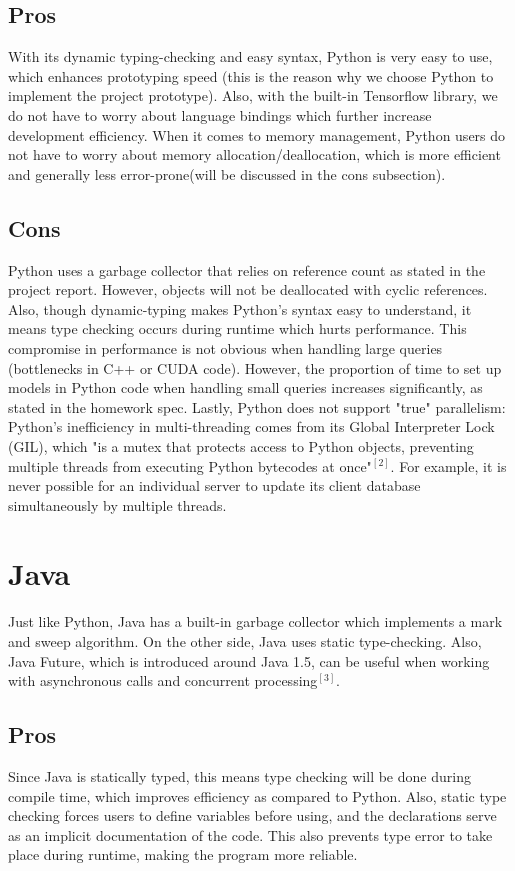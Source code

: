 \documentclass[letterpaper,twocolumn,10pt]{article}
\begin{document}
\subsection{Pros}
With its dynamic typing-checking and easy syntax, Python is very easy to use, which enhances prototyping speed (this is the reason why we choose Python to implement the project prototype). Also, with the built-in Tensorflow library, we do not have to worry about  language bindings which further increase development efficiency. When it comes to memory management, Python users do not have to worry about memory allocation/deallocation, which is more efficient and generally less error-prone(will be discussed in the cons subsection).

\subsection{Cons}
Python uses a garbage collector that relies on reference count as stated in the project report. However, objects will not be deallocated with cyclic references. Also, though dynamic-typing makes Python's syntax easy to understand, it means type checking occurs during runtime which hurts performance. This compromise in performance is not obvious when handling large queries (bottlenecks in C++ or CUDA code). However, the proportion of time to set up models in Python code when handling small queries increases significantly, as stated in the homework spec. Lastly, Python does not support "true" parallelism: Python's inefficiency in multi-threading comes from its Global Interpreter Lock (GIL), which "is a mutex that protects access to Python objects, preventing multiple threads from executing Python bytecodes at once"$^{[2]}$. For example, it is never possible for an individual server to update its client database simultaneously by multiple threads.

\section{Java}
Just like Python, Java has a built-in garbage collector which implements a mark and sweep algorithm. On the other side, Java uses static type-checking.  Also, Java Future, which is introduced around Java 1.5, can be useful when working with asynchronous calls and concurrent processing$^{[3]}$. 

\subsection{Pros}
Since Java is statically typed, this means type checking will be done during compile time, which improves efficiency as compared to Python. Also, static type checking forces users to define variables before using, and the declarations serve as an implicit documentation of the code. This also prevents type error to take place during runtime, making the program more reliable. \\
\end{document}
